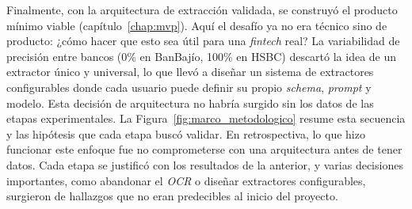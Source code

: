 Finalmente, con la arquitectura de extracción validada, se construyó el producto mínimo viable (capítulo~\ref{chap:mvp}). Aquí el desafío ya no era técnico sino de producto: ¿cómo hacer que esto sea útil para una \textit{fintech} real? La variabilidad de precisión entre bancos (0\% en BanBajío, 100\% en HSBC) descartó la idea de un extractor único y universal, lo que llevó a diseñar un sistema de extractores configurables donde cada usuario puede definir su propio \textit{schema}, \textit{prompt} y modelo. Esta decisión de arquitectura no habría surgido sin los datos de las etapas experimentales. La Figura~\ref{fig:marco_metodologico} resume esta secuencia y las hipótesis que cada etapa buscó validar. En retrospectiva, lo que hizo funcionar este enfoque fue no comprometerse con una arquitectura antes de tener datos. Cada etapa se justificó con los resultados de la anterior, y varias decisiones importantes, como abandonar el \textit{OCR} o diseñar extractores configurables, surgieron de hallazgos que no eran predecibles al inicio del proyecto.
